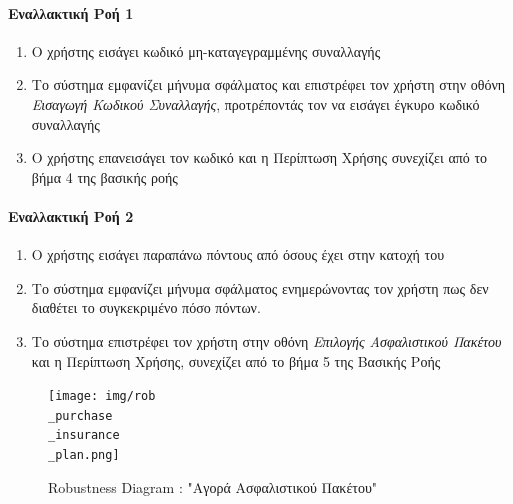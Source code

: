 \documentclass{../ol-softwaremanual}
\begin{document}
	\paragraph{Εναλλακτική Ροή 1 }
	
	\begin{enumerate}
		\item Ο χρήστης εισάγει κωδικό μη-καταγεγραμμένης συναλλαγής
		\item Το σύστημα εμφανίζει μήνυμα σφάλματος και επιστρέφει τον χρήστη στην  οθόνη \textit{Εισαγωγή Κωδικού Συναλλαγής}, προτρέποντάς τον να εισάγει έγκυρο κωδικό συναλλαγής
		\item Ο χρήστης επανεισάγει τον κωδικό και η Περίπτωση Χρήσης συνεχίζει από το βήμα 4 της βασικής ροής
	\end{enumerate}
	
	\paragraph{Εναλλακτική Ροή 2}
	\begin{enumerate}
		\item Ο χρήστης εισάγει παραπάνω πόντους από όσους έχει στην κατοχή του
		\item Το σύστημα εμφανίζει μήνυμα σφάλματος ενημερώνοντας τον χρήστη πως δεν διαθέτει το συγκεκριμένο πόσο πόντων.
		\item Το σύστημα επιστρέφει τον χρήστη στην οθόνη \textit{Επιλογής Ασφαλιστικού Πακέτου} και η Περίπτωση Χρήσης, συνεχίζει από το βήμα 5 της Βασικής Ροής
	\end{enumerate}
	
	\begin{figure}[htbp!]
		\texttt{[image: img/rob\\\_purchase\\\_insurance\\\_plan.png]}
		\caption{\en Robustness Diagram : "\gr Αγορά Ασφαλιστικού Πακέτου\en"\gr}
	\end{figure}
	
	\newpage
	\centering
	
\end{document}
